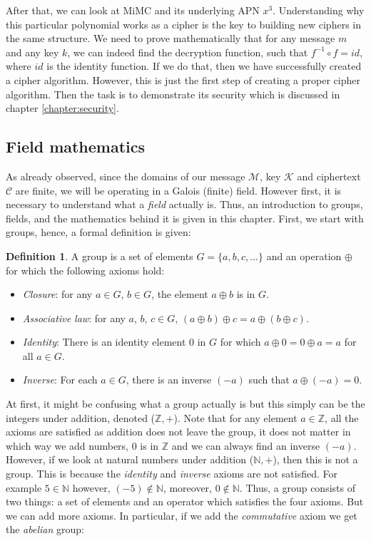 \documentclass{Resources/UoBLab1}
\theoremstyle{definition}
\newtheorem{definition}[theorem]{Definition}
\begin{document}
After that, we can look at MiMC and its underlying APN $x^3$. Understanding why this particular polynomial works as a cipher is the key to building new ciphers in the same structure. We need to prove mathematically that for any message $m$ and any key $k$, we can indeed find the decryption function, such that \(f^{-1} \circ f = id\), where $id$ is the identity function. If we do that, then we have successfully created a cipher algorithm. However, this is just the first step of creating a proper cipher algorithm. Then the task is to demonstrate its security which is discussed in chapter \ref{chapter:security}.

\subsection{Field mathematics}\label{sub:field-maths}
As already observed, since the domains of our message $\mathcal{M}$, key $\mathcal{K}$ and ciphertext $\mathcal{C}$ are finite, we will be operating in a Galois (finite) field. However first, it is necessary to understand what a \textit{field} actually is. Thus, an introduction to groups, fields, and the mathematics behind it is given in this chapter. First, we start with groups, hence, a formal definition is given:
\begin{definition}
    A group is a set of elements $G = \{a, b, c, ...\}$ and an operation $\oplus$ for which the following axioms hold:
    \begin{itemize}
        \item \textit{Closure}: for any $a \in G$, $b \in G$, the element $a \oplus b$ is in $G$.
        \item \textit{Associative law}: for any $a$, $b$, $c \in G$, $(a \oplus b) \oplus c = a \oplus (b \oplus c)$.
        \item \textit{Identity}: There is an identity element $0$ in $G$ for which $a \oplus 0 = 0 \oplus a = a$ for all $a \in G$.
        \item \textit{Inverse}: For each $a \in G$, there is an inverse $(-a)$ such that $a \oplus (-a) = 0$.
    \end{itemize}
\end{definition}
At first, it might be confusing what a group actually is but this simply can be the integers under addition, denoted ($\mathbb{Z}, +$). Note that for any element $a \in \mathbb{Z}$, all the axioms are satisfied as addition does not leave the group, it does not matter in which way we add numbers, $0$ is in $\mathbb{Z}$ and we can always find an inverse $(-a)$. However, if we look at natural numbers under addition ($\mathbb{N}, +$), then this is not a group. This is because the \textit{identity} and \textit{inverse} axioms are not satisfied. For example $5 \in \mathbb{N}$ however, $(-5) \notin \mathbb{N}$, moreover, $0 \notin \mathbb{N}$. Thus, a group consists of two things: a set of elements and an operator which satisfies the four axioms. But we can add more axioms. In particular, if we add the \textit{commutative} axiom we get the \textit{abelian} group:
\end{document}
